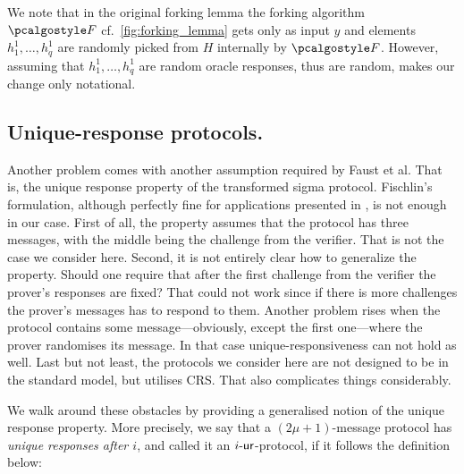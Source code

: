 \let\accentvec\vec \documentclass[runningheads]{llncs}
\begin{document}
We note that in the original forking lemma the forking algorithm $\forking$
cf.~\cref{fig:forking_lemma} gets only as input $y$ and elements $h^1_1, \ldots,
h^1_q$ are randomly picked from $H$ internally by $\forking$. However, assuming
that $h^1_1, \ldots, h^1_q$ are random oracle responses, thus are random, makes
our change only notational.

\subsection{Unique-response protocols.}
Another problem comes with another assumption required by Faust et al. That is,
the unique response property of the transformed sigma protocol. Fischlin's
formulation, although perfectly fine for applications presented in
\cite{C:Fischlin05,INDOCRYPT:FKMV12}, is not enough in our case. First of all,
the property assumes that the protocol has three messages, with the middle being
the challenge from the verifier. That is not the case we consider here. Second,
it is not entirely clear how to generalize the property. Should one require that
after the first challenge from the verifier the prover's responses are fixed?
That could not work since if there is more challenges the prover's messages has
to respond to them. Another problem rises when the protocol contains some
message---obviously, except the first one---where the prover randomises its
message. In that case unique-responsiveness can not hold as well. Last but not
least, the protocols we consider here are not designed to be in the standard
model, but utilises CRS. That also complicates things considerably.

We walk around these obstacles by providing a generalised notion of the unique
response property. More precisely, we say that a $(2\mu + 1)$-message protocol
has \emph{unique responses after $i$}, and called it an ${i\text{-}\mathsf{ur}}$-protocol, if it
follows the definition below:
\end{document}
